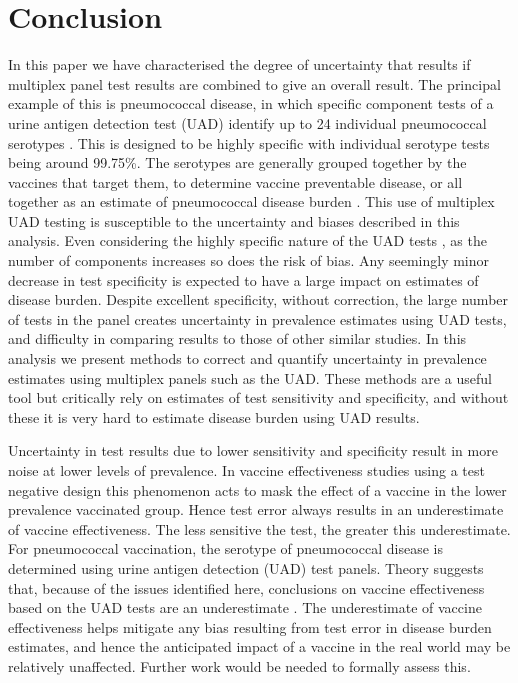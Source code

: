 \documentclass[10pt,letterpaper]{article}
\begin{document}
\section*{Conclusion}

In this paper we have characterised the degree of uncertainty that results if multiplex panel test results are combined to give an overall result. The principal example of this is pneumococcal disease, in which specific component tests of a urine antigen detection test (UAD) identify up to 24 individual pneumococcal serotypes \cite{pride2012,bonten2015}. This is designed to be highly specific with individual serotype tests being around 99.75\%. The serotypes are generally grouped together by the vaccines that target them, to determine vaccine preventable disease, or all together as an estimate of pneumococcal disease burden \cite{hyams2023a}. This use of multiplex UAD testing is susceptible to the uncertainty and biases described in this analysis. Even considering the highly specific nature of the UAD tests \cite{pride2012}, as the number of components increases so does the risk of bias. Any seemingly minor decrease in test specificity is expected to have a large impact on estimates of disease burden. Despite excellent specificity, without correction, the large number of tests in the panel creates uncertainty in prevalence estimates using UAD tests, and difficulty in comparing results to those of other similar studies. In this analysis we present methods to correct and quantify uncertainty in prevalence estimates using multiplex panels such as the UAD. These methods are a useful tool but critically rely on estimates of test sensitivity and specificity, and without these it is very hard to estimate disease burden using UAD results.

Uncertainty in test results due to lower sensitivity and specificity result in more noise at lower levels of prevalence\cite{haile2022,endo2020}. In vaccine effectiveness studies using a test negative design this phenomenon acts to mask the effect of a vaccine in the lower prevalence vaccinated group. Hence test error always results in an underestimate of vaccine effectiveness\cite{endo2020}. The less sensitive the test, the greater this underestimate. For pneumococcal vaccination, the serotype of pneumococcal disease is determined using urine antigen detection (UAD) test panels\cite{pride2012,bonten2015}. Theory suggests that, because of the issues identified here, conclusions on vaccine effectiveness based on the UAD tests are an underestimate \cite{endo2020}. The underestimate of vaccine effectiveness helps mitigate any bias resulting from test error in disease burden estimates, and hence the anticipated impact of a vaccine in the real world may be relatively unaffected. Further work would be needed to formally assess this.
\end{document}
